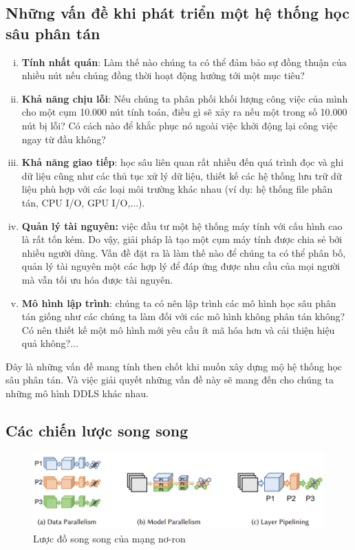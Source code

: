 \documentclass[11pt,a4paper]{article}
\numberwithin{equation}{subsection}
\numberwithin{figure}{subsection}
\numberwithin{table}{subsection}
\begin{document}
\subsection{Những vấn đề khi phát triển một hệ thống học sâu phân tán}
\begin{enumerate}[i. ]
	\item \textbf{Tính nhất quán}:  Làm thế nào chúng ta có thể đảm bảo sự đồng thuận của nhiều nút nếu chúng đồng thời hoạt động hướng tới một mục tiêu?
	
	\item \textbf{Khả năng chịu lỗi}: Nếu chúng ta phân phối khối lượng công việc của mình cho một cụm 10.000 nút tính toán, điều gì sẽ xảy ra nếu một trong số 10.000 nút bị lỗi? Có cách nào để khắc phục nó ngoài việc khởi động lại công việc ngay từ đầu không?
	
		\item \textbf{Khả năng giao tiếp}: học sâu liên quan rất nhiều đến quá trình đọc và ghi dữ liệu cũng như các thủ tục xử lý dữ liệu, thiết kế các hệ thống lưu trữ dữ liệu phù hợp với các loại môi trường khác nhau (ví dụ: hệ thống file phân tán, CPU I/O, GPU I/O,...).
		
		\item \textbf{Quản lý tài nguyên:} việc đầu tư một hệ thống máy tính với cấu hình cao là rất tốn kém. Do vậy, giải pháp là tạo một cụm máy tính được chia sẻ bởi nhiều người dùng.  Vấn đề đặt ra là làm thế nào để chúng ta có thể phân bố, quản lý tài nguyên một các hợp lý để đáp ứng được nhu cầu của mọi người mà vẫn tối ưu hóa được tài nguyên.
		
		\item \textbf{Mô hình lập trình}: chúng ta có nên lập trình các mô hình học sâu phân tán giống như các chúng ta làm đối với các mô hình không phân tán không? Có nên thiết kế một mô hình mới yêu cầu ít mã hóa hơn và cải thiện hiệu quả không?...
\end{enumerate}

Đây là những vấn đề mang tính then chốt khi muốn xây dựng mộ hệ thống học sâu phân tán. Và việc giải quyết những vấn đề này sẽ mang đến cho chúng ta những mô hình DDLS khác nhau.\\




\subsection{Các chiến lược song song}
\begin{figure}[!h]
\begin{center}
\includegraphics[scale=0.7]{parallel_1.png}
\end{center}
\caption{Lược đồ song song của mạng nơ-ron }
\end{figure}
\end{document}
